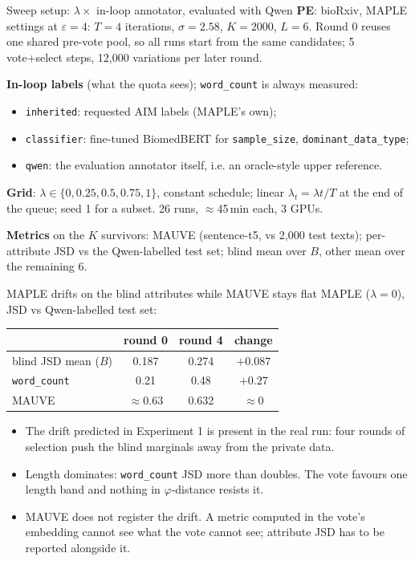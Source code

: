 \documentclass[11pt,aspectratio=169]{beamer}
\begin{document}
\begin{frame}{Sweep setup: $\lambda \times$ in-loop annotator, evaluated with Qwen}
\textbf{PE}: bioRxiv, MAPLE settings at $\varepsilon = 4$: $T = 4$ iterations, $\sigma = 2.58$, $K = 2000$, $L = 6$. Round 0 reuses one shared pre-vote pool, so all runs start from the same candidates; 5 vote+select steps, 12{,}000 variations per later round.

\medskip
\textbf{In-loop labels} (what the quota sees); \texttt{word\_count} is always measured:
\begin{itemize}
  \item \texttt{inherited}: requested AIM labels (MAPLE's own);
  \item \texttt{classifier}: fine-tuned BiomedBERT for \texttt{sample\_size}, \texttt{dominant\_data\_type};
  \item \texttt{qwen}: the evaluation annotator itself, i.e. an oracle-style upper reference.
\end{itemize}

\medskip
\textbf{Grid}: $\lambda \in \{0, 0.25, 0.5, 0.75, 1\}$, constant schedule; linear $\lambda_t = \lambda t/T$ at the end of the queue; seed 1 for a subset. 26 runs, $\approx$45\,min each, 3 GPUs.

\medskip
\textbf{Metrics} on the $K$ survivors: MAUVE (sentence-t5, vs 2{,}000 test texts); per-attribute JSD vs the Qwen-labelled test set; blind mean over $B$, other mean over the remaining 6.
\end{frame}

\begin{frame}{MAPLE drifts on the blind attributes while MAUVE stays flat}
MAPLE ($\lambda = 0$), JSD vs Qwen-labelled test set:

\medskip
\centering\small
\begin{tabular}{lccc}
\toprule
 & round 0 & round 4 & change\\
\midrule
blind JSD mean ($B$)    & 0.187 & \alert{0.274} & $+0.087$\\
\quad \texttt{word\_count} & 0.21 & \alert{0.48} & $+0.27$\\
MAUVE                   & $\approx 0.63$ & 0.632 & $\approx 0$\\
\bottomrule
\end{tabular}

\raggedright
\medskip
\begin{itemize}
  \item The drift predicted in Experiment 1 is present in the real run: four rounds of selection push the blind marginals away from the private data.
  \item \alert{Length dominates}: \texttt{word\_count} JSD more than doubles. The vote favours one length band and nothing in $\varphi$-distance resists it.
  \item MAUVE does not register the drift. A metric computed in the vote's embedding cannot see what the vote cannot see; attribute JSD has to be reported alongside it.
\end{itemize}
\end{frame}
\end{document}
